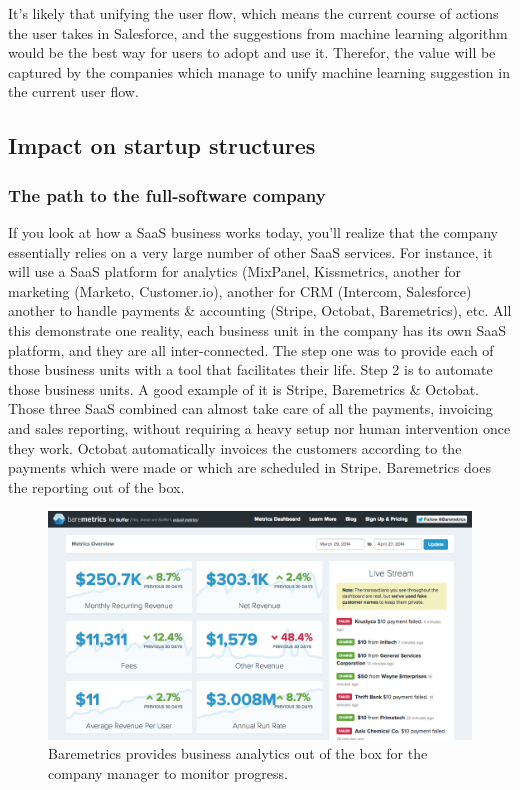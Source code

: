 \documentclass[12pt]{article}
\begin{document}
It's likely that unifying the user flow, which means the current course of
actions the user takes in Salesforce, and the suggestions from machine learning
algorithm would be the best way for users to adopt and use it. Therefor, the
value will be captured by the companies which manage to unify machine learning
suggestion in the current user flow.

\subsection{Impact on startup structures}

\subsubsection{The path to the full-software company}

If you look at how a SaaS business works today, you'll realize that the company
essentially relies on a very large number of other SaaS services. For instance,
it will use a SaaS platform for analytics (MixPanel, Kissmetrics, another for
marketing (Marketo, Customer.io), another for CRM (Intercom, Salesforce) another
to handle payments \& accounting (Stripe, Octobat, Baremetrics), etc.
All this demonstrate one reality, each business unit in the company has its own
SaaS platform, and they are all inter-connected. The step one was to provide
each of those business units with a tool that facilitates their life. Step 2 is
to automate those business units. A good example of it is Stripe, Baremetrics
\& Octobat. Those three SaaS combined can almost take care of all the payments,
invoicing and sales reporting, without requiring a heavy setup nor human
intervention once they work. Octobat automatically invoices the customers
according to the payments which were made or which are scheduled in Stripe.
Baremetrics does the reporting out of the box.

\begin{figure}[ht]
    \centering
    \includegraphics[width=\textwidth]{baremetrics}
    \caption{Baremetrics provides business analytics out of the box for the
    company manager to monitor progress.}
    \label{fig:baremetrics}
\end{figure}
\end{document}
